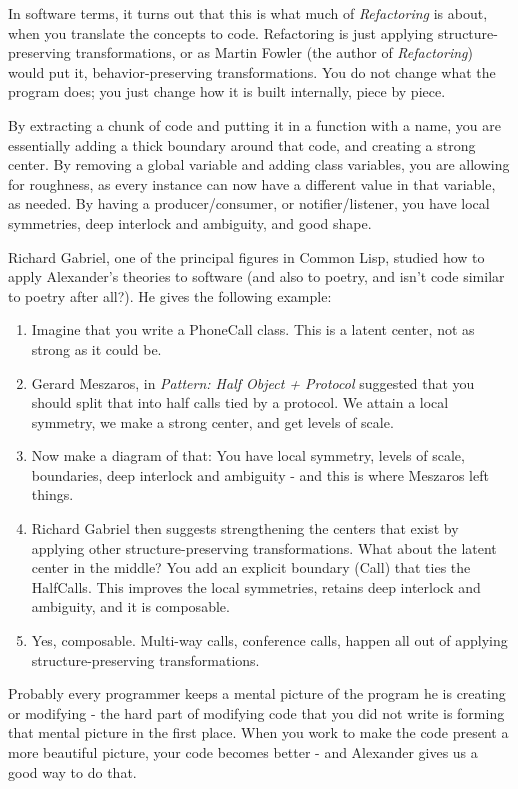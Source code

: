 In software terms, it turns out that this is what much of \textit{Refactoring} is about, when you translate the concepts to code. Refactoring is just applying structure-preserving transformations, or as Martin Fowler (the author of \textit{Refactoring}) would put it, behavior-preserving transformations. You do not change what the program does; you just change how it is built internally, piece by piece.

By extracting a chunk of code and putting it in a function with a name, you are essentially adding a thick boundary around that code, and creating a strong center. By removing a global variable and adding class variables, you are allowing for roughness, as every instance can now have a different value in that variable, as needed. By having a producer/consumer, or notifier/listener, you have local symmetries, deep interlock and ambiguity, and good shape.

Richard Gabriel, one of the principal figures in Common Lisp, studied how to apply Alexander's theories to software (and also to poetry, and isn't code similar to poetry after all?).  He gives the following example:
\begin{enumerate}
 \item Imagine that you write a PhoneCall class. This is a latent center, not as strong as it could be.
 \item Gerard Meszaros, in \textit{Pattern: Half Object + Protocol} suggested that you should split that into half calls tied by a protocol.
 We attain a local symmetry, we make a strong center, and get levels of scale.
 \item Now make a diagram of that:
 You have local symmetry, levels of scale, boundaries, deep interlock and ambiguity - and this is where Meszaros left things.
 \item Richard Gabriel then suggests strengthening the centers that exist by applying other structure-preserving transformations. What about the latent center in the middle?
 You add an explicit boundary (Call) that ties the HalfCalls. This improves the local symmetries, retains deep interlock and ambiguity, and it is composable.
 \item Yes, composable.
 Multi-way calls, conference calls, happen all out of applying structure-preserving transformations.
\end{enumerate}
Probably every programmer keeps a mental picture of the program he is creating or modifying - the hard part of modifying code that you did not write is forming that mental picture in the first place. When you work to make the code present a more beautiful picture, your code becomes better - and Alexander gives us a good way to do that.

